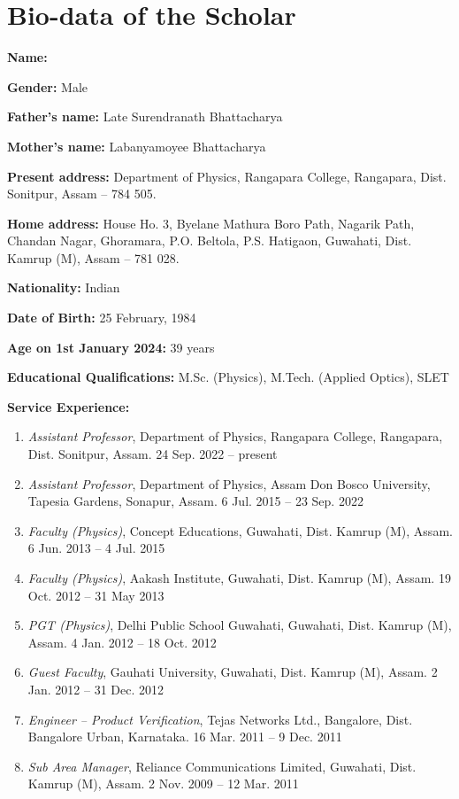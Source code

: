 \chapter{Bio-data of the Scholar} \label{appendix:biodata}

    \textbf{Name:} \authorname
    
    \textbf{Gender:} Male
    
    \textbf{Father’s name:} Late Surendranath Bhattacharya
    
    \textbf{Mother’s name:} Labanyamoyee Bhattacharya
    
    \textbf{Present address:} Department of Physics, Rangapara College, Rangapara, Dist. Sonitpur, Assam -- 784 505.
    
    \textbf{Home address:} House Ho. 3, Byelane Mathura Boro Path, Nagarik Path, Chandan Nagar, Ghoramara, P.O. Beltola, P.S. Hatigaon, Guwahati, Dist. Kamrup (M), Assam -- 781 028.
    
    \textbf{Nationality:} Indian
    
    \textbf{Date of Birth:} 25 February, 1984
    
    \textbf{Age on 1st January 2024:} 39 years
    
    \textbf{Educational Qualifications:} M.Sc. (Physics), M.Tech. (Applied Optics), SLET
    
    \textbf{Service Experience:} \vspace{-3ex}
    \begin{enumerate}
    	\item \textit{Assistant Professor}, {Department of Physics}, {Rangapara College}, {Rangapara, Dist. Sonitpur, Assam}. {24 Sep. 2022 -- present}
    	\item \textit{Assistant Professor}, {Department of Physics}, {Assam Don Bosco University}, {Tapesia Gardens, Sonapur, Assam}. {6 Jul. 2015 -- 23 Sep. 2022}
    	\item \textit{Faculty (Physics)}, {Concept Educations}, {Guwahati, Dist. Kamrup (M), Assam}. {6 Jun. 2013 -- 4 Jul. 2015}
    	\item \textit{Faculty (Physics)}, {Aakash Institute}, {Guwahati, Dist. Kamrup (M), Assam}. {19 Oct. 2012 -- 31 May 2013}
    	\item \textit{PGT (Physics)}, {Delhi Public School Guwahati}, {Guwahati, Dist. Kamrup (M), Assam}. {4 Jan. 2012 -- 18 Oct. 2012}
    	\item \textit{Guest Faculty}, {Gauhati University}, {Guwahati, Dist. Kamrup (M), Assam}. {2 Jan. 2012 -- 31 Dec. 2012}
    	\item \textit{Engineer -- Product Verification}, {Tejas Networks Ltd.}, {Bangalore, Dist. Bangalore Urban, Karnataka}. {16 Mar. 2011 -- 9 Dec. 2011}
    	\item \textit{Sub Area Manager}, {Reliance Communications Limited}, {Guwahati, Dist. Kamrup (M), Assam}. {2 Nov. 2009 -- 12 Mar. 2011}
    \end{enumerate}